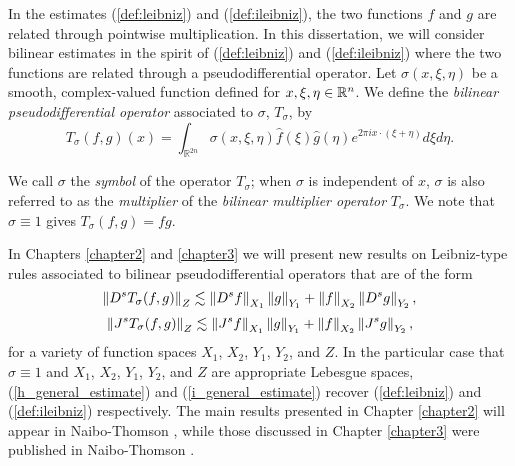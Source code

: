 In the estimates (\ref{def:leibniz}) and (\ref{def:ileibniz}), the two functions $f$ and $g$ are related through pointwise multiplication. In this dissertation, we will consider bilinear estimates in the spirit of (\ref{def:leibniz}) and (\ref{def:ileibniz}) where the two functions are related through a pseudodifferential operator. Let $\sigma(x,\xi,\eta)$ be a smooth, complex-valued function defined for $x,\xi,\eta\in{{\mathbb R}^n}$. We define the \textit{bilinear pseudodifferential operator}  associated to $\sigma$, $T_\sigma$, by 
\begin{equation}\label{psydo}
T_{\sigma}(f,g)(x) = \int_{\mathbb{R}^{2n}} \sigma(x,\xi,\eta) \widehat{f}(\xi)\widehat{g}(\eta)e^{2\pi i x\cdot(\xi+\eta)}d\xi d\eta. 
\end{equation}

\noindent We call $\sigma$ the \textit{symbol} of the operator $T_\sigma$; when $\sigma$ is independent of $x$, $\sigma$ is also referred to as the \textit{multiplier} of the \textit{bilinear multiplier operator} $T_\sigma$. We note that $\sigma \equiv 1$ gives $T_\sigma(f,g) = fg$. 


In Chapters \ref{chapter2} and \ref{chapter3} we will present new results on Leibniz-type rules associated to bilinear pseudodifferential operators that are of the form 
\begin{equation}\label{h_general_estimate}
\left\|D^s T_\sigma(f,g)\right\|_{Z} \lesssim \left\|D^sf\right\|_{X_1}\left\|g\right\|_{Y_1} + \left\|f\right\|_{X_2}\left\|D^s g\right\|_{Y_2} ,
\end{equation}
\begin{equation}\label{i_general_estimate}
\left\|J^sT_\sigma(f,g)\right\|_{Z} \lesssim \left\|J^sf\right\|_{X_1}\left\|g\right\|_{Y_1} + \left\|f\right\|_{X_2}\left\|J^sg\right\|_{Y_2} ,
\end{equation}
for a variety of function spaces $X_1$, $X_2$, $Y_1$, $Y_2$, and $Z$. In the particular case that $\sigma \equiv 1$ and $X_1$, $X_2$, $Y_1$, $Y_2$, and $Z$ are appropriate Lebesgue spaces, (\ref{h_general_estimate}) and (\ref{i_general_estimate}) recover (\ref{def:leibniz}) and (\ref{def:ileibniz}) respectively. The main results presented in Chapter \ref{chapter2} will appear in Naibo-Thomson \cite{NaTh_CM}, while those discussed in Chapter \ref{chapter3} were published in Naibo-Thomson \cite{MR3912862}.

